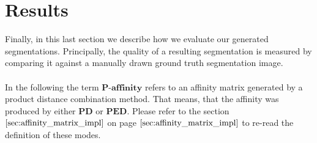 

\chapter{Results}
Finally, in this last section we describe how we evaluate our generated segmentations. Principally, the quality of a resulting segmentation is measured by comparing it against a manually drawn ground truth segmentation image. \\ \\
In the following the term $\textbf{P-affinity}$ refers to an affinity matrix generated by a product distance combination method. That means, that the affinity was produced by either $\textbf{PD}$ or $\textbf{PED}$. Please refer to the section $\ref{sec:affinity_matrix_impl}$ on page $\pageref{sec:affinity_matrix_impl}$ to re-read the definition of these modes. 

